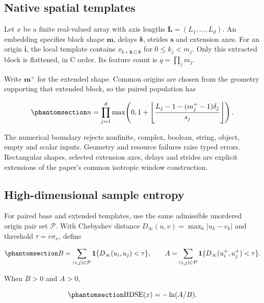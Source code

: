 \documentclass[
  english,
  11pt,
]{article}
\begin{document}
\subsection{Native spatial templates}\label{native-spatial-templates}

Let \(x\) be a finite real-valued array with axis lengths
\(\boldsymbol L=(L_1,\ldots,L_d)\). An embedding specifies block shape
\(\boldsymbol m\), delays \(\boldsymbol\delta\), strides
\(\boldsymbol s\) and extension axes. For an origin \(\boldsymbol i\),
the local template contains
\(x_{\boldsymbol i+\boldsymbol k\odot\boldsymbol\delta}\) for
\(0\leq k_j<m_j\). Only this extracted block is flattened, in C order.
Its feature count is \(q=\prod_jm_j\).

Write \(\boldsymbol m^+\) for the extended shape. Common origins are
chosen from the geometry supporting that extended block, so the paired
population has

\begin{equation}\protect\phantomsection\label{eq:origins}{
n=\prod_{j=1}^{d}\max\!\left(0,
1+\left\lfloor\frac{L_j-1-(m_j^+-1)\delta_j}{s_j}\right\rfloor\right).
}\end{equation}

The numerical boundary rejects nonfinite, complex, boolean, string,
object, empty and scalar inputs. Geometry and resource failures raise
typed errors. Rectangular shapes, selected extension axes, delays and
strides are explicit extensions of the paper's common isotropic window
construction.

\subsection{High-dimensional sample
entropy}\label{high-dimensional-sample-entropy}

For paired base and extended templates, use the same admissible
unordered origin pair set \(\mathcal P\). With Chebyshev distance
\(D_\infty(u,v)=\max_k|u_k-v_k|\) and threshold \(\tau=r\sigma_x\),
define

\begin{equation}\protect\phantomsection\label{eq:matches}{
B=\sum_{(i,j)\in\mathcal P}\mathbf 1\{D_\infty(u_i,u_j)<\tau\},\qquad
A=\sum_{(i,j)\in\mathcal P}\mathbf 1\{D_\infty(u_i^+,u_j^+)<\tau\}.
}\end{equation}

When \(B>0\) and \(A>0\),

\begin{equation}\protect\phantomsection\label{eq:hdse}{
\operatorname{HDSE}(x)=-\ln(A/B).
}\end{equation}
\end{document}
